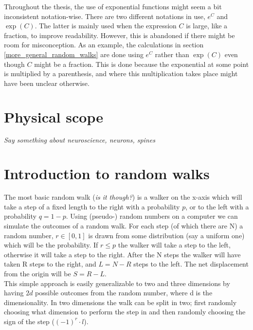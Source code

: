 Throughout the thesis, the use of exponential functions might seem a bit inconsistent notation-wise. 
There are two different notations in use, $e^C$ and $\exp(C)$. 
The latter is mainly used when the expression $C$ is large, like a fraction, to improve readability. 
However, this is abandoned if there might be room for misconception. 
As an example, the calculations in section \ref{more_general_random_walks} are done using $e^C$ rather than $\exp(C)$ even though $C$ might be a fraction.
This is done because the exponential at some point is multiplied by a parenthesis, and where this multiplication takes place might have been unclear otherwise.

\section{Physical scope}\label{theory:physical_scope }

\emph{Say something about neuroscience, neurons, spines}

\section{Introduction to random walks}\label{introduction_to_random_walks}

The most basic random walk (\emph{is it though?}) is a walker on the x-axis which will take a step of a fixed length to the right with a probability $p$, or to the left with a probability $q=1-p$. 
Using (pseudo-) random numbers on a computer we can simulate the outcomes of a random walk. 
For each step (of which there are N) a random number, $r\in [0,1]$ is drawn from some distribution (say a uniform one) which will be the probability. 
If $r\leq p$ the walker will take a step to the left, otherwise it will take a step to the right. 
After the N steps the walker will have taken R steps to the right, and $L = N-R$ steps to the left. 
The net displacement from the origin will be $S = R-L$. \\
This simple approach is easily generalizable to two and three dimensions by having $2d$ possible outcomes from the random number, where d is the dimensionality. 
In two dimensions the walk can be split in two; first randomly choosing what dimension to perform the step in and then randomly choosing the sign of the step ($(-1)^r\cdot l$).

